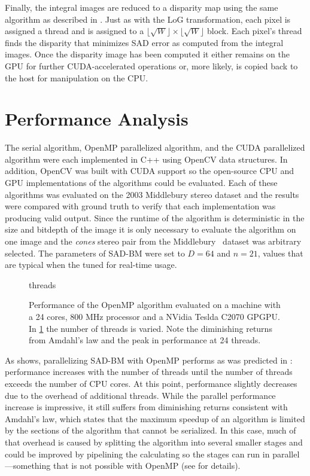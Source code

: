 \documentclass{article}
\newcommand{\floor}[1]{\lfloor#1\rfloor}
\begin{document}
Finally, the integral images are reduced to a disparity map using the same
algorithm as described in . Just as with the LoG transformation,
each pixel is assigned a thread and is assigned to a $\floor{\sqrt{W}} \times
\floor{\sqrt{W}}$ block. Each pixel's thread finds the disparity that minimizes
SAD error as computed from the integral images. Once the disparity image has
been computed it either remains on the GPU for further CUDA-accelerated
operations or, more likely, is copied back to the host for manipulation on the
CPU.

\section{Performance Analysis}
\label{sec:perf}
The serial algorithm, OpenMP parallelized algorithm, and the CUDA parallelized
algorithm were each implemented in C++ using OpenCV data structures. In
addition, OpenCV was built with CUDA support so the open-source CPU and GPU
implementations of the algorithms could be evaluated. Each of these algorithms
was evaluated on the 2003 Middlebury stereo dataset and the results were
compared with ground truth to verify that each implementation was producing
valid output. Since the runtime of the algorithm is deterministic in the size
and bitdepth of the image it is only necessary to evaluate the algorithm on one
image and the \textit{cones} stereo pair from the
Middlebury~\cite{scharstein2003} dataset was arbitrary selected. The parameters
of SAD-BM were set to $D = 64$ and $n = 21$, values that are typical when the
tuned for real-time usage.

\begin{figure}
    \centering
    {threads}
    \caption{
        Performance of the OpenMP algorithm evaluated on a machine with a 24
        cores, 800 MHz processor and a NVidia Teslda C2070 GPGPU. In
        \ref{fig:perf-omp} the number of threads is varied. Note the
        diminishing returns from Amdahl's law and the peak in performance at 24
        threads.
    }
    \label{fig:perf-omp}
\end{figure}

As  shows, parallelizing SAD-BM with OpenMP performs as was
predicted in : performance increases with the number of
threads until the number of threads exceeds the number of CPU cores. At this
point, performance slightly decreases due to the overhead of additional
threads.  While the parallel performance increase is impressive, it still
suffers from diminishing returns consistent with Amdahl's law, which states
that the maximum speedup of an algorithm is limited by the sections of the
algorithm that cannot be serialized. In this case, much of that overhead is
caused by splitting the algorithm into several smaller stages and could be
improved by pipelining the calculating so the stages can run in
parallel---something that is not possible with OpenMP (see 
for details).
\end{document}
